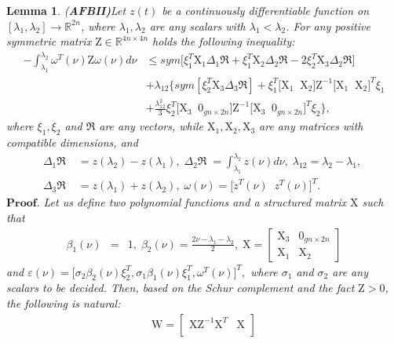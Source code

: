 \documentclass[preprint,11pt]{elsarticle}
\newtheorem{lemma}{Lemma}
\begin{document}
\begin{lemma} {(\bf AFBII)}\label{Lemma3}
Let $z(t)$ be a continuously differentiable function on $[\lambda_{1},\lambda_{2}]\rightarrow \mathbb{R}^{2n}$, where $\lambda_{1},\lambda_{2}$ are any scalars with $\lambda_{1}<\lambda_{2}$. For any positive symmetric matrix $\mathrm{Z}\in \mathbb{R}^{4n\times 4n}$ holds the following inequality:
\begin{align}\label{15}
-\int^{\lambda_2}_{\lambda_1}{\omega}^T(\nu)\mathrm{Z}{\omega}(\nu)d\nu
&\leq sym\big[ \xi_1^T \mathrm{X}_1\Delta_1\Re+\xi_1^T\mathrm{X}_2\Delta_2\Re-2\xi_2^T\mathrm{X}_3\Delta_2\Re\big]\nonumber\\
&+\lambda_{12}\Big\{sym[\xi_2^T\mathrm{X}_3\Delta_3\Re]+ \xi_1^T \big[\mathrm{X}_1\;\;\mathrm{X}_2 \big]\mathrm{Z}^{-1}\big[ \mathrm{X}_1\;\;\mathrm{X}_2 \big]^T\xi_1\nonumber\\
&+\frac{\lambda_{12}^2}{3}\xi_2^T\big[ \mathrm{X}_3\;\;0_{gn\times2n} \big]\mathrm{Z}^{-1}\big[ \mathrm{X}_3\;\;0_{gn\times2n} \big]^T\xi_2
 \Big\},
\end{align}
where $\xi_1,\xi_2$ and $\Re$ are any vectors, while $\mathrm{X}_1,\mathrm{X}_2,\mathrm{X}_3$ are any matrices with compatible dimensions, and
\begin{align*}
\Delta_1\Re\;&=z(\lambda_2)-z(\lambda_1),\;
\Delta_2\Re\;=\int^{\lambda_2}_{\lambda_1}z(\nu)d\nu,\;\lambda_{12}=\lambda_2-\lambda_1,\;\\
\Delta_3\Re\;&=z(\lambda_1)+z(\lambda_2),\;
\omega(\nu)=\Big[\dot{z}^T(\nu)\;\;z^T(\nu)\Big]^T.
\end{align*}
$\textbf{Proof.}$ Let us define two polynomial functions and a structured matrix $\mathrm{X}$ such that
\begin{eqnarray*}
\beta_1(\nu)&=&1,\;
\beta_2(\nu)=\frac{2\nu-\lambda_1-\lambda_2}{2},\;
\mathrm{X}=
\begin{bmatrix}
\mathrm{X}_3   &  0_{gn\times 2n}\\
\mathrm{X}_1 &  \mathrm{X}_2
\end{bmatrix}
\end{eqnarray*}
and
$
\varepsilon(\nu)=\big[ \sigma_2\beta_2(\nu)\xi_2^T,\sigma_1\beta_1(\nu)\xi_1^T,\omega^T(\nu)\big]^T,
$
where $\sigma_1$ and $\sigma_2$ are any scalars to be decided. Then, based on the Schur complement and the fact $\mathrm{Z}>0$, the following is natural:
\begin{eqnarray*}
\mathrm{W}=
\begin{bmatrix}
  \mathrm{X}\mathrm{Z}^{-1}\mathrm{X}^T&      \mathrm{X}\\

\end{bmatrix}
\end{eqnarray*}
\end{lemma}
\end{document}
